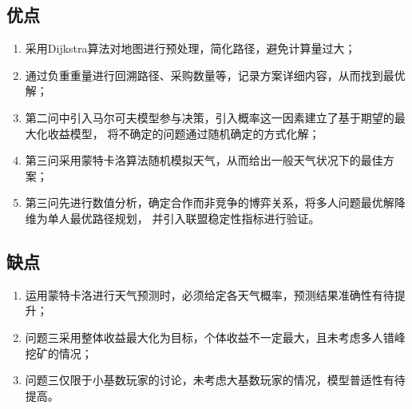 \subsection{优点}

\begin{enumerate}
    \item 采用Dijkstra算法对地图进行预处理，简化路径，避免计算量过大；
    \item 通过负重重量进行回溯路径、采购数量等，记录方案详细内容，从而找到最优解；
    \item 第二问中引入马尔可夫模型参与决策，引入概率这一因素建立了基于期望的最大化收益模型，
        将不确定的问题通过随机确定的方式化解；
    \item 第三问采用蒙特卡洛算法随机模拟天气，从而给出一般天气状况下的最佳方案；
    \item 第三问先进行数值分析，确定合作而非竞争的博弈关系，将多人问题最优解降维为单人最优路径规划，
        并引入联盟稳定性指标进行验证。
\end{enumerate}

\subsection{缺点}

\begin{enumerate}
    \item 运用蒙特卡洛进行天气预测时，必须给定各天气概率，预测结果准确性有待提升；
    \item 问题三采用整体收益最大化为目标，个体收益不一定最大，且未考虑多人错峰挖矿的情况；
    \item 问题三仅限于小基数玩家的讨论，未考虑大基数玩家的情况，模型普适性有待提高。
\end{enumerate}